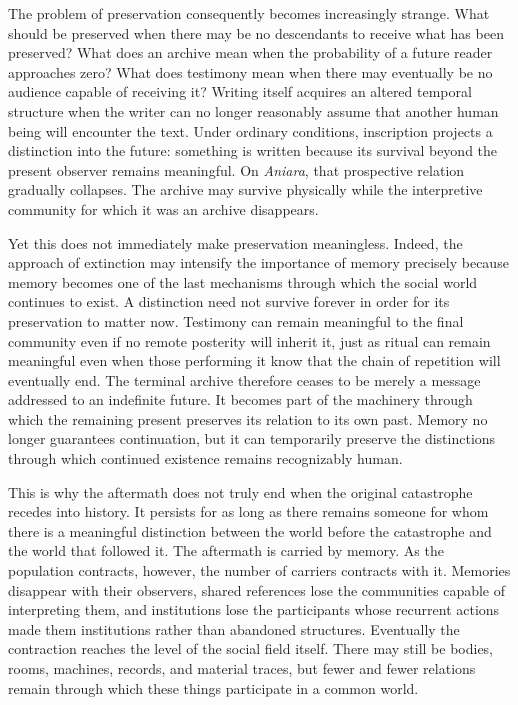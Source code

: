 \documentclass[11pt,oneside]{book}
\theoremstyle{definition}
\theoremstyle{remark}
\begin{document}
The problem of preservation consequently becomes increasingly strange. What should be preserved when there may be no descendants to receive what has been preserved? What does an archive mean when the probability of a future reader approaches zero? What does testimony mean when there may eventually be no audience capable of receiving it? Writing itself acquires an altered temporal structure when the writer can no longer reasonably assume that another human being will encounter the text. Under ordinary conditions, inscription projects a distinction into the future: something is written because its survival beyond the present observer remains meaningful. On \emph{Aniara}, that prospective relation gradually collapses. The archive may survive physically while the interpretive community for which it was an archive disappears.

Yet this does not immediately make preservation meaningless. Indeed, the approach of extinction may intensify the importance of memory precisely because memory becomes one of the last mechanisms through which the social world continues to exist. A distinction need not survive forever in order for its preservation to matter now. Testimony can remain meaningful to the final community even if no remote posterity will inherit it, just as ritual can remain meaningful even when those performing it know that the chain of repetition will eventually end. The terminal archive therefore ceases to be merely a message addressed to an indefinite future. It becomes part of the machinery through which the remaining present preserves its relation to its own past. Memory no longer guarantees continuation, but it can temporarily preserve the distinctions through which continued existence remains recognizably human.

This is why the aftermath does not truly end when the original catastrophe recedes into history. It persists for as long as there remains someone for whom there is a meaningful distinction between the world before the catastrophe and the world that followed it. The aftermath is carried by memory. As the population contracts, however, the number of carriers contracts with it. Memories disappear with their observers, shared references lose the communities capable of interpreting them, and institutions lose the participants whose recurrent actions made them institutions rather than abandoned structures. Eventually the contraction reaches the level of the social field itself. There may still be bodies, rooms, machines, records, and material traces, but fewer and fewer relations remain through which these things participate in a common world.
\end{document}
